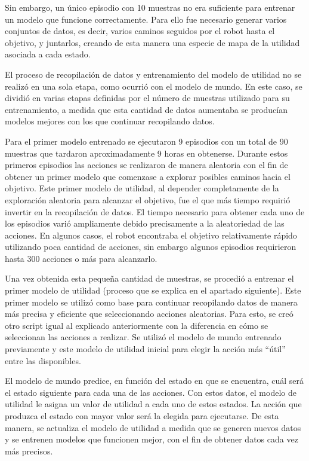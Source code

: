 Sin embargo, un único episodio con 10 muestras no era suficiente para entrenar un modelo que funcione correctamente. Para ello fue necesario generar varios conjuntos de datos, es decir, varios 
caminos seguidos por el robot hasta el objetivo, y juntarlos, creando de esta manera una especie de mapa de la utilidad asociada a cada estado. 

El proceso de recopilación de datos y entrenamiento del modelo de utilidad no se realizó en una sola etapa, como ocurrió con el modelo de mundo. En este caso, se dividió en varias etapas 
definidas por el número de muestras utilizado para su entrenamiento, a medida que esta cantidad de datos aumentaba se producían modelos mejores con los que continuar recopilando datos.

Para el primer modelo entrenado se ejecutaron 9 episodios con un total de 90 muestras que tardaron aproximadamente 9 horas en obtenerse. Durante estos primeros episodios las acciones se 
realizaron de manera aleatoria con el fin de obtener un primer modelo que comenzase a explorar posibles caminos hacia el objetivo. Este primer modelo de utilidad, al depender completamente de 
la exploración aleatoria para alcanzar el objetivo, fue el que más tiempo requirió invertir en la recopilación de datos. El tiempo necesario para obtener cada uno de los episodios varió 
ampliamente debido precisamente a la aleatoriedad de las acciones. En algunos casos, el robot encontraba el objetivo relativamente rápido utilizando poca cantidad de acciones, sin embargo 
algunos episodios requirieron hasta 300 acciones o más para alcanzarlo.

Una vez obtenida esta pequeña cantidad de muestras, se procedió a entrenar el primer modelo de utilidad (proceso que se explica en el apartado siguiente). Este primer modelo se utilizó como 
base para continuar recopilando datos de manera más precisa y eficiente que seleccionando acciones aleatorias. Para esto, se creó otro \gls{script} igual al explicado anteriormente con la 
diferencia en cómo se seleccionan las acciones a realizar. Se utilizó el modelo de mundo entrenado previamente y este modelo de utilidad inicial para elegir la acción más “útil” entre las 
disponibles.

El modelo de mundo predice, en función del estado en que se encuentra, cuál será el estado siguiente para cada una de las acciones. Con estos datos, el modelo de utilidad le asigna un valor 
de utilidad a cada uno de estos estados. La acción que produzca el estado con mayor valor será la elegida para ejecutarse. De esta manera, se actualiza el modelo de utilidad a medida que se 
generen nuevos datos y se entrenen modelos que funcionen mejor, con el fin de obtener datos cada vez más precisos.

